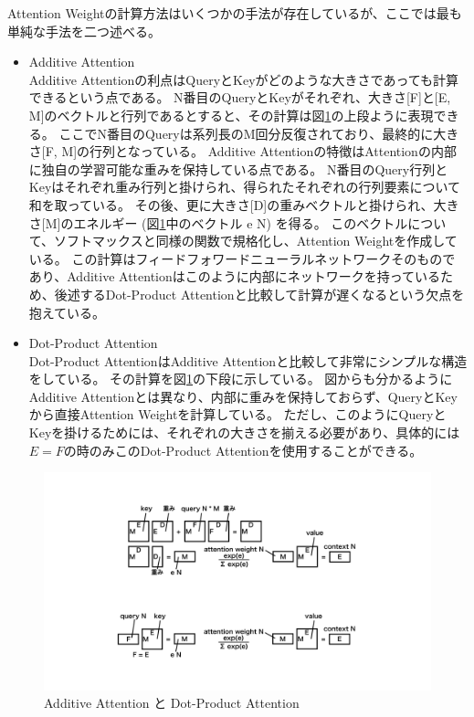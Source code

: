 Attention Weightの計算方法はいくつかの手法が存在しているが、ここでは最も単純な手法を二つ述べる。
\begin{itemize}
  \item Additive Attention\cite{BahdanauAttention}\\
  Additive Attentionの利点はQueryとKeyがどのような大きさであっても計算できるという点である。
  N番目のQueryとKeyがそれぞれ、大きさ[F]と[E, M]のベクトルと行列であるとすると、その計算は図\ref{20Attention}の上段ように表現できる。
  ここでN番目のQueryは系列長のM回分反復されており、最終的に大きさ[F, M]の行列となっている。
  Additive Attentionの特徴はAttentionの内部に独自の学習可能な重みを保持している点である。
  N番目のQuery行列とKeyはそれぞれ重み行列と掛けられ、得られたそれぞれの行列要素について和を取っている。
  その後、更に大きさ[D]の重みベクトルと掛けられ、大きさ[M]のエネルギー (図\ref{20Attention}中のベクトル e N) を得る。
  このベクトルについて、ソフトマックスと同様の関数で規格化し、Attention Weightを作成している。
  この計算はフィードフォワードニューラルネットワークそのものであり、Additive Attentionはこのように内部にネットワークを持っているため、後述するDot-Product Attentionと比較して計算が遅くなるという欠点を抱えている。

  \item Dot-Product Attention\cite{LuongAttention}\\
  Dot-Product AttentionはAdditive Attentionと比較して非常にシンプルな構造をしている。
  その計算を図\ref{20Attention}の下段に示している。
  図からも分かるようにAdditive Attentionとは異なり、内部に重みを保持しておらず、QueryとKeyから直接Attention Weightを計算している。
  ただし、このようにQueryとKeyを掛けるためには、それぞれの大きさを揃える必要があり、具体的には$E=F$の時のみこのDot-Product Attentionを使用することができる。
\end{itemize}
  
\begin{figure}[htbp]
 \centering
 \includegraphics[trim = 200 100 200 100, width=1.0\textwidth, clip]{Figure/2DeepLearning/20Attention.png}
 \caption{Additive Attention と Dot-Product Attention}
 \label{20Attention}
\end{figure}

